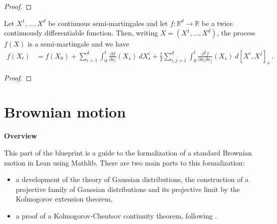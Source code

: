 \begin{proof}

\end{proof}


\begin{theorem}\label{thm:Ito_formula}
Let $X^1, \ldots, X^d$ be continuous semi-martingales and let $f : \mathbb{R}^d \to \mathbb{R}$ be a twice continuously differentiable function.
Then, writing $X = (X^1, \ldots, X^d)$, the process $f(X)$ is a semi-martingale and we have
\begin{align*}
  f(X_t)
  &= f(X_0)
  + \sum_{i=1}^d \int_0^t \frac{\partial f}{\partial x_i}(X_s) \: dX^i_s
  + \frac{1}{2} \sum_{i,j=1}^d \int_0^t \frac{\partial^2 f}{\partial x_i \partial x_j}(X_s) \: d[X^i, X^j]_s
  \: .
\end{align*}
\end{theorem}

\begin{proof}

\end{proof}


%

\part{Brownian motion}

\textbf{Overview}

This part of the blueprint is a guide to the formalization of a standard Brownian motion in Lean using Mathlib. There are two main parts to this formalization:
\begin{itemize}
  \item a development of the theory of Gaussian distributions, the construction of a projective family of Gaussian distributions and its projective limit by the Kolmogorov extension theorem,
  \item a proof of a Kolmogorov-Chentsov continuity theorem, following \cite{kratschmer2023kolmogorov}.
\end{itemize}

